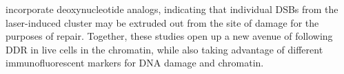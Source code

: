 incorporate deoxynucleotide analogs, indicating that individual DSBs from the laser-induced cluster may be extruded out from the site of damage for the purposes of repair. Together, these studies open up a new avenue of following DDR in live cells in the chromatin, while also taking advantage of different immunofluorescent markers for DNA damage and chromatin.